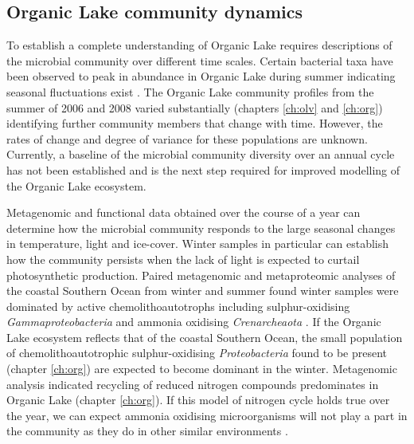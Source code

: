 \subsection{Organic Lake community dynamics}
To establish a complete understanding of Organic Lake requires descriptions of the microbial community over different time scales.
Certain bacterial taxa have been observed to peak in abundance in Organic Lake during summer indicating seasonal fluctuations exist \cite{James1994}.
The Organic Lake community profiles from the summer of 2006 and 2008 varied substantially (chapters \ref{ch:olv} and \ref{ch:org}) identifying further community members that change with time.
However, the rates of change and degree of variance for these populations are unknown.
Currently, a baseline of the microbial community diversity over an annual cycle has not been established and is the next step required for improved modelling of the Organic Lake ecosystem.

Metagenomic and functional data obtained over the course of a year can determine how the microbial community responds to the large seasonal changes in temperature, light and ice-cover.
Winter samples in particular can establish how the community persists when the lack of light is expected to curtail photosynthetic production.
Paired metagenomic and metaproteomic analyses of the coastal Southern Ocean from winter and summer found winter samples were dominated by active chemolithoautotrophs including sulphur-oxidising \emph{Gammaproteobacteria} and ammonia oxidising \emph{Crenarcheaota} \cite{Grzymski2012, Williams2012b}.
If the Organic Lake ecosystem reflects that of the coastal Southern Ocean, the small population of chemolithoautotrophic sulphur-oxidising \emph{Proteobacteria} found to be present (chapter \ref{ch:org}) are expected to become dominant in the winter.
Metagenomic analysis indicated recycling of reduced nitrogen compounds predominates in Organic Lake (chapter \ref{ch:org}).
If this model of nitrogen cycle holds true over the year, we can expect ammonia oxidising microorganisms will not play a part in the community as they do in other similar environments \cite{Voytek1999, Grzymski2012, Williams2012b}.

